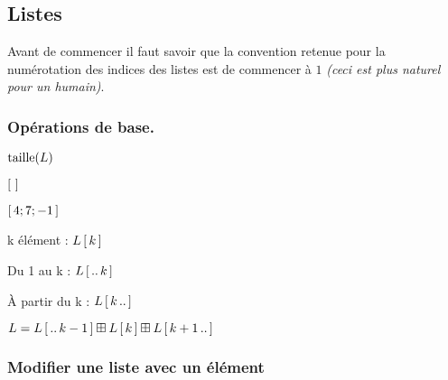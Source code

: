 \documentclass[12pt,a4paper]{article}
\begin{document}

\subsection{Listes}

Avant de commencer il faut savoir que la convention retenue pour la numérotation des indices des listes est de commencer à $1$ \emph{(ceci est plus naturel pour un humain)}.


\subsubsection{Opérations de base.}


\begin{latexex}
$\operatorname{taille}(L)$
\end{latexex}





\begin{latexex}
$\left[ \,  \, \right]$

$\left[ \, 4 ; 7 ; -1 \, \right]$
\end{latexex}





\begin{latexex}
k\ieme{} élément :
$L\left[ \, k \, \right]$

Du 1\ier{} au k\ieme{} :
$L\left[ \, ..\,k \, \right]$

À partir du k\ieme{} :
$L\left[ \, k\,.. \, \right]$
\end{latexex}





\begin{latexex}
$L =          L\left[ \, ..\,k-1 \, \right]
     \mathbin{\boxplus} L\left[ \, k \, \right]
     \mathbin{\boxplus} L\left[ \, k+1\,.. \, \right]$
\end{latexex}




\subsubsection{Modifier une liste avec un élément}
\end{document}
